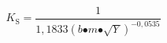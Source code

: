 \[K_{\mathrm{S}}\mathrm{=}\frac{\mathrm{1}}{\mathrm{1,1833}{\left(b\mathrm{\bullet }m\mathrm{\bullet }\sqrt{Y}\right)}^{\mathrm{-}\mathrm{0,0535}}}\]